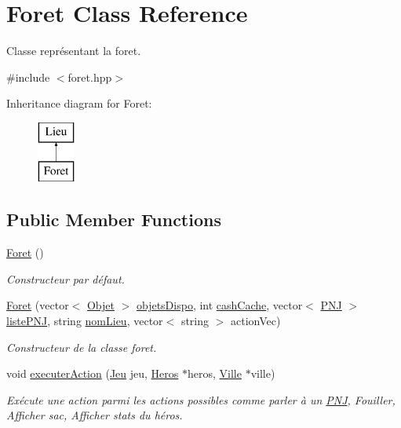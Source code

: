 \hypertarget{class_foret}{\section{Foret Class Reference}
\label{class_foret}
}


Classe représentant la foret.  




{\ttfamily \#include $<$foret.\-hpp$>$}

Inheritance diagram for Foret\-:\begin{figure}[H]
\begin{center}
\leavevmode
\includegraphics[height=2.000000cm]{class_foret}
\end{center}
\end{figure}
\subsection*{Public Member Functions}
\begin{DoxyCompactItemize}
\item 
\hyperlink{class_foret_a02cdb9636edbf4c2c6e406290cfad4db}{Foret} ()
\begin{DoxyCompactList}\small\item\em Constructeur par défaut. \end{DoxyCompactList}\item 
\hyperlink{class_foret_a936e4958fb4c860f0eebcea8e3652de1}{Foret} (vector$<$ \hyperlink{class_objet}{Objet} $>$ \hyperlink{class_lieu_a3a65fbb8ecba3f2e265905730ad2e631}{objets\-Dispo}, int \hyperlink{class_lieu_a90b76b521f92a43626ccd29ed5a29f89}{cash\-Cache}, vector$<$ \hyperlink{class_p_n_j}{P\-N\-J} $>$ \hyperlink{class_lieu_a8c1e20b105f7972f22d8f16651de4ebd}{liste\-P\-N\-J}, string \hyperlink{class_lieu_a1e48889fe5c581f043b8bd77ca497fc7}{nom\-Lieu}, vector$<$ string $>$ action\-Vec)
\begin{DoxyCompactList}\small\item\em Constructeur de la classe foret. \end{DoxyCompactList}\item 
void \hyperlink{class_foret_a7bde97b50ed9be97d62f84fe4868d44f}{executer\-Action} (\hyperlink{class_jeu}{Jeu} jeu, \hyperlink{class_heros}{Heros} $\ast$heros, \hyperlink{class_ville}{Ville} $\ast$ville)
\begin{DoxyCompactList}\small\item\em Exécute une action parmi les actions possibles comme parler à un \hyperlink{class_p_n_j}{P\-N\-J}, Fouiller, Afficher sac, Afficher stats du héros. \end{DoxyCompactList}\end{DoxyCompactItemize}
